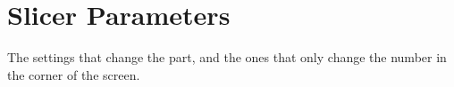 
\chapter{Slicer Parameters}

 The settings that change the part, and the ones that
only change the number in the corner of the screen.

